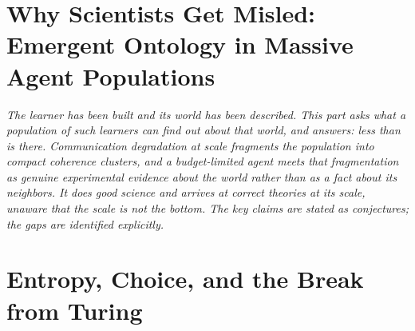 \documentclass[12pt,openright,twoside]{book}
\theoremstyle{remark}
\theoremstyle{plain}
\theoremstyle{remark}
\theoremstyle{plain}
\theoremstyle{plain}
\begin{document}
\part{Why Scientists Get Misled: Emergent Ontology in Massive Agent Populations}
\label{part:sciencebot}

\vspace{1em}
\begin{mdframed}[backgroundcolor=remarkgray, linecolor=gray!60,
                 linewidth=1pt, topline=false, rightline=false,
                 bottomline=false]
\small\itshape
The learner has been built and its world has been described.
This part asks what a \emph{population} of such learners can find out
about that world, and answers: less than is there.
Communication degradation at scale fragments the population into compact
coherence clusters, and a budget-limited agent meets that fragmentation
as genuine experimental evidence about the world rather than as a fact
about its neighbors.
It does good science and arrives at correct theories at its scale,
unaware that the scale is not the bottom.
The key claims are stated as conjectures; the gaps are identified
explicitly.
\end{mdframed}

\bigskip


\part{Entropy, Choice, and the Break from Turing}
\label{part:choice}
\end{document}

